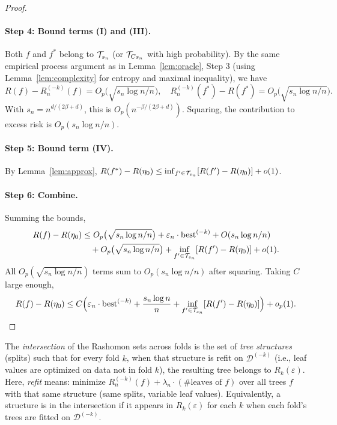 \documentclass[12pt]{article}
\begin{document}
\begin{proof}
\paragraph{Step 4: Bound terms (I) and (III).}
Both $f$ and $f^*$ belong to $\mathcal{T}_{s_n}$ (or $\mathcal{T}_{C s_n}$ with high probability). By the same empirical process argument as in Lemma~\ref{lem:oracle}, Step 3 (using Lemma~\ref{lem:complexity} for entropy and maximal inequality), we have
\[
R(f) - R_n^{(-k)}(f) = O_p\bigl( \sqrt{s_n \log n / n} \bigr), \quad R_n^{(-k)}(f^*) - R(f^*) = O_p\bigl( \sqrt{s_n \log n / n} \bigr).
\]
With $s_n = n^{d/(2\beta+d)}$, this is $O_p(n^{-\beta/(2\beta+d)})$. Squaring, the contribution to excess risk is $O_p(s_n \log n / n)$.

\paragraph{Step 5: Bound term (IV).}
By Lemma~\ref{lem:approx}, $R(f^*) - R(\eta_0) \le \inf_{f' \in \mathcal{T}_{s_n}}[R(f') - R(\eta_0)] + o(1)$.

\paragraph{Step 6: Combine.}
Summing the bounds,
\begin{align*}
R(f) - R(\eta_0) &\le O_p\bigl( \sqrt{s_n \log n / n} \bigr) + \varepsilon_n \cdot \text{best}^{(-k)} + O(s_n \log n / n) \\
&\quad + O_p\bigl( \sqrt{s_n \log n / n} \bigr) + \inf_{f' \in \mathcal{T}_{s_n}}[R(f') - R(\eta_0)] + o(1).
\end{align*}
All $O_p(\sqrt{s_n \log n / n})$ terms sum to $O_p(s_n \log n / n)$ after squaring. Taking $C$ large enough,
\[
R(f) - R(\eta_0) \le C \Bigl( \varepsilon_n \cdot \text{best}^{(-k)} + \frac{s_n \log n}{n} + \inf_{f' \in \mathcal{T}_{s_n}}[R(f') - R(\eta_0)] \Bigr) + o_p(1).
\]
\end{proof}

\begin{definition}
\label{def:intersection}
The \emph{intersection} of the Rashomon sets across folds is the set of \emph{tree structures} (splits) such that for every fold $k$, when that structure is refit on $\mathcal{D}^{(-k)}$ (i.e., leaf values are optimized on data not in fold $k$), the resulting tree belongs to $R_k(\varepsilon)$. Here, \emph{refit} means: minimize $R_n^{(-k)}(f) + \lambda_n \cdot (\#\text{leaves of } f)$ over all trees $f$ with that same structure (same splits, variable leaf values). Equivalently, a structure is in the intersection if it appears in $R_k(\varepsilon)$ for each $k$ when each fold's trees are fitted on $\mathcal{D}^{(-k)}$.
\end{definition}
\end{document}
